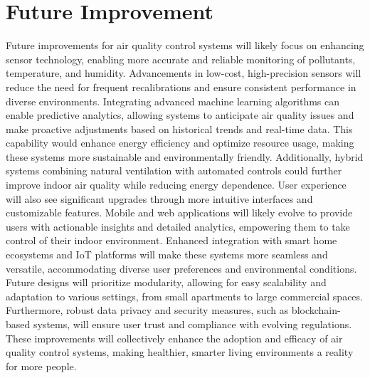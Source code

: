 \documentclass[USenglish,oneside,twocolumn]{article}
\begin{document}
\section{Future Improvement}
Future improvements for air quality control systems will likely focus on enhancing sensor technology, enabling more accurate and reliable monitoring of pollutants, temperature, and humidity. Advancements in low-cost, high-precision sensors will reduce the need for frequent recalibrations and ensure consistent performance in diverse environments. Integrating advanced machine learning algorithms can enable predictive analytics, allowing systems to anticipate air quality issues and make proactive adjustments based on historical trends and real-time data. This capability would enhance energy efficiency and optimize resource usage, making these systems more sustainable and environmentally friendly. Additionally, hybrid systems combining natural ventilation with automated controls could further improve indoor air quality while reducing energy dependence. User experience will also see significant upgrades through more intuitive interfaces and customizable features. Mobile and web applications will likely evolve to provide users with actionable insights and detailed analytics, empowering them to take control of their indoor environment. Enhanced integration with smart home ecosystems and IoT platforms will make these systems more seamless and versatile, accommodating diverse user preferences and environmental conditions. Future designs will prioritize modularity, allowing for easy scalability and adaptation to various settings, from small apartments to large commercial spaces. Furthermore, robust data privacy and security measures, such as blockchain-based systems, will ensure user trust and compliance with evolving regulations. These improvements will collectively enhance the adoption and efficacy of air quality control systems, making healthier, smarter living environments a reality for more people.
\end{document}
